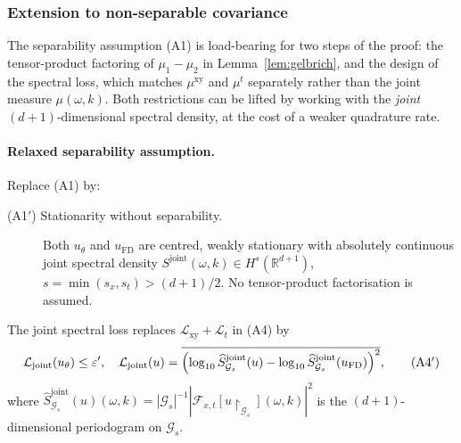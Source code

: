\documentclass[review,12pt]{elsarticle}
\begin{document}
\subsubsection{Extension to non-separable covariance}
\label{subsec:nonsep-extension}

The separability assumption (A1) is load-bearing for two steps of the
proof: the tensor-product factoring of \(\mu_1 - \mu_2\) in
Lemma~\ref{lem:gelbrich}, and the design of the spectral loss, which
matches \(\mu^{\mathrm{xy}}\) and \(\mu^t\) separately rather than
the joint measure \(\mu(\omega, k)\). Both restrictions can be lifted
by working with the \emph{joint} \((d+1)\)-dimensional spectral
density, at the cost of a weaker quadrature rate.

\paragraph{Relaxed separability assumption.}
Replace (A1) by:
\begin{description}
\item[(A1$'$) Stationarity without separability.]
Both \(u_\theta\) and \(u_{\mathrm{FD}}\) are centred, weakly
stationary with absolutely continuous joint spectral density
\(S^{\mathrm{joint}}(\omega, k) \in H^s(\mathbb R^{d+1})\),
\(s = \min(s_x, s_t) > (d+1)/2\). No tensor-product factorisation
is assumed.
\end{description}

The joint spectral loss replaces
\(\mathcal L_{\mathrm{xy}} + \mathcal L_t\) in (A4) by
\begin{equation}
\label{eq:joint-tolerance}
\mathcal L_{\mathrm{joint}}(u_\theta) \le \varepsilon', \quad
\mathcal L_{\mathrm{joint}}(u) =
\overline{\Bigl(
\log_{10}\widehat S^{\mathrm{joint}}_{\mathcal G_s}(u)
- \log_{10}\widehat S^{\mathrm{joint}}_{\mathcal G_s}(u_{\mathrm{FD}})
\Bigr)^2},
\tag{A4$'$}
\end{equation}
where
\(\widehat S^{\mathrm{joint}}_{\mathcal G_s}(u)(\omega, k) =
|\mathcal G_s|^{-1}
|\mathcal F_{x,t}[u\!\upharpoonright_{\mathcal G_s}](\omega,k)|^2\)
is the \((d+1)\)-dimensional periodogram on \(\mathcal G_s\).
\end{document}
